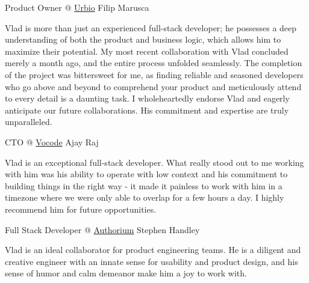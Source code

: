 

\begin{cventries}

  \cventry
    {Product Owner @ \href{https://urb.io}{Urbio}} %
    {Filip Marusca} %
    {} %
    {} %
    {
      \begin{cvitems} %
        Vlad is more than just an experienced full-stack developer; he possesses a deep understanding of both the product and business logic, which allows him to maximize their potential. My most recent collaboration with Vlad concluded merely a month ago, and the entire process unfolded seamlessly. The completion of the project was bittersweet for me, as finding reliable and seasoned developers who go above and beyond to comprehend your product and meticulously attend to every detail is a daunting task. I wholeheartedly endorse Vlad and eagerly anticipate our future collaborations. His commitment and expertise are truly unparalleled.
      \end{cvitems}
    }

  \cventry
    {CTO @ \href{https://vocode.dev}{Vocode}} %
    {Ajay Raj} %
    {} %
    {} %
    {
      \begin{cvitems} %
        Vlad is an exceptional full-stack developer. What really stood out to me working with him was his ability to operate with low context and his commitment to building things in the right way - it made it painless to work with him in a timezone where we were only able to overlap for a few hours a day. I highly recommend him for future opportunities.
      \end{cvitems}
    }

  \cventry
    {Full Stack Developer @ \href{https://authorium.com}{Authorium}} %
    {Stephen Handley} %
    {} %
    {} %
    {
      \begin{cvitems} %
        Vlad is an ideal collaborator for product engineering teams. He is a diligent and creative engineer with 
        an innate sense for usability and product design, and his sense of humor and calm demeanor 
        make him a joy to work with.
      \end{cvitems}
    }

\end{cventries}
